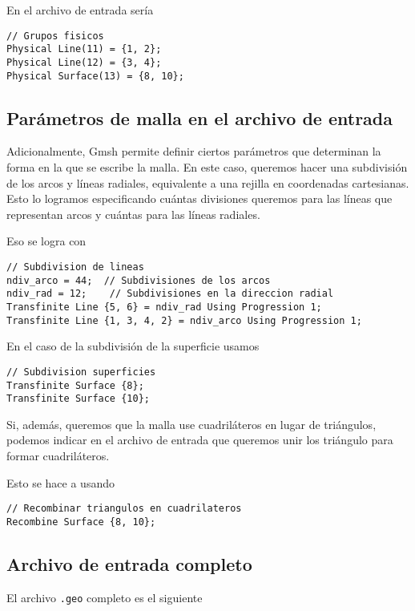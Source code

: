 En el archivo de entrada sería
\begin{verbatim}
// Grupos fisicos
Physical Line(11) = {1, 2};
Physical Line(12) = {3, 4};
Physical Surface(13) = {8, 10};
\end{verbatim}


\subsection{Parámetros de malla en el archivo de entrada}
Adicionalmente, Gmsh permite definir ciertos parámetros que determinan la forma en la que se escribe
la malla. En este caso, queremos hacer una subdivisión de los arcos y líneas radiales, equivalente
a una rejilla en coordenadas cartesianas. Esto lo logramos especificando cuántas divisiones queremos
para las líneas que representan arcos y cuántas para las líneas radiales.

Eso se logra con

\begin{verbatim}
// Subdivision de lineas
ndiv_arco = 44;  // Subdivisiones de los arcos
ndiv_rad = 12;    // Subdivisiones en la direccion radial
Transfinite Line {5, 6} = ndiv_rad Using Progression 1;
Transfinite Line {1, 3, 4, 2} = ndiv_arco Using Progression 1;
\end{verbatim}

En el caso de la subdivisión de la superficie usamos

\begin{verbatim}
// Subdivision superficies
Transfinite Surface {8};
Transfinite Surface {10};
\end{verbatim}

Si, además, queremos que la malla use cuadriláteros en lugar de triángulos, podemos indicar en el
archivo de entrada que queremos unir los triángulo para formar cuadriláteros.

Esto se hace a usando

\begin{verbatim}
// Recombinar triangulos en cuadrilateros
Recombine Surface {8, 10};
\end{verbatim}


\subsection{Archivo de entrada completo}
El archivo \texttt{.geo} completo es el siguiente

